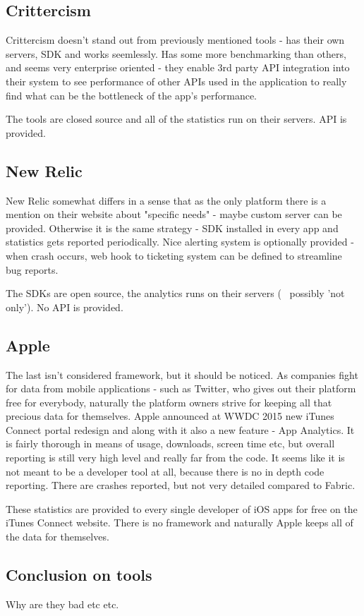 \subsection{Crittercism}

Crittercism doesn't stand out from previously mentioned tools - has their own servers, SDK and works seemlessly. Has some more benchmarking than others, and seems very enterprise oriented - they enable 3rd party API integration into their system to see performance of other APIs used in the application to really find what can be the bottleneck of the app's performance.

The tools are closed source and all of the statistics run on their servers. API is provided.


\subsection{New Relic}

New Relic somewhat differs in a sense that as the only platform there is a mention on their website about "specific needs" - maybe custom server can be provided. Otherwise it is the same strategy - SDK installed in every app and statistics gets reported periodically. Nice alerting system is optionally provided - when crash occurs, web hook to ticketing system can be defined to streamline bug reports.

The SDKs are open source, the analytics runs on their servers (~ possibly 'not only'). No API is provided.


\subsection{Apple}

The last isn't considered framework, but it should be noticed. As companies fight for data from mobile applications - such as Twitter, who gives out their platform free for everybody, naturally the platform owners strive for keeping all that precious data for themselves. Apple announced at WWDC 2015 new iTunes Connect portal redesign and along with it also a new feature - App Analytics. It is fairly thorough in means of usage, downloads, screen time etc, but overall reporting is still very high level and really far from the code. It seems like it is not meant to be a developer tool at all, because there is no in depth code reporting. There are crashes reported, but not very detailed compared to Fabric.

These statistics are provided to every single developer of iOS apps for free on the iTunes Connect website. There is no framework and naturally Apple keeps all of the data for themselves.


\subsection*{Conclusion on tools}

Why are they bad etc etc.